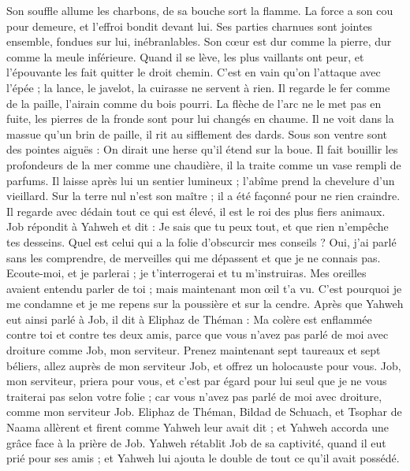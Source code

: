 \begin{multicols}{2}
Son souffle allume les charbons, de sa bouche sort la flamme.
La force a son cou pour demeure, et l'effroi bondit devant lui.
Ses parties charnues sont jointes ensemble, fondues sur lui, inébranlables.
Son cœur est dur comme la pierre, dur comme la meule inférieure.
Quand il se lève, les plus vaillants ont peur, et l'épouvante les fait quitter le droit chemin.
C'est en vain qu'on l'attaque avec l'épée ; la lance, le javelot, la cuirasse ne servent à rien.
Il regarde le fer comme de la paille, l'airain comme du bois pourri.
La flèche de l'arc ne le met pas en fuite, les pierres de la fronde sont pour lui changés en chaume.
Il ne voit dans la massue qu'un brin de paille, il rit au sifflement des dards.
Sous son ventre sont des pointes aiguës : On dirait une herse qu'il étend sur la boue.
Il fait bouillir les profondeurs de la mer comme une chaudière, il la traite comme un vase rempli de parfums.
Il laisse après lui un sentier lumineux ; l'abîme prend la chevelure d'un vieillard.
Sur la terre nul n'est son maître ; il a été façonné pour ne rien craindre.
Il regarde avec dédain tout ce qui est élevé, il est le roi des plus fiers animaux.
\VerseOne{}Job répondit à Yahweh et dit :
Je sais que tu peux tout, et que rien n'empêche tes desseins.
Quel est celui qui a la folie d'obscurcir mes conseils ? Oui, j'ai parlé sans les comprendre, de merveilles qui me dépassent et que je ne connais pas.
Ecoute-moi, et je parlerai ; je t'interrogerai et tu m'instruiras.
Mes oreilles avaient entendu parler de toi ; mais maintenant mon œil t'a vu.
C'est pourquoi je me condamne et je me repens sur la poussière et sur la cendre.
Après que Yahweh eut ainsi parlé à Job, il dit à Eliphaz de Théman : Ma colère est enflammée contre toi et contre tes deux amis, parce que vous n'avez pas parlé de moi avec droiture comme Job, mon serviteur.
Prenez maintenant sept taureaux et sept béliers, allez auprès de mon serviteur Job, et offrez un holocauste pour vous. Job, mon serviteur, priera pour vous, et c'est par égard pour lui seul que je ne vous traiterai pas selon votre folie ; car vous n'avez pas parlé de moi avec droiture, comme mon serviteur Job.
Eliphaz de Théman, Bildad de Schuach, et Tsophar de Naama allèrent et firent comme Yahweh leur avait dit ; et Yahweh accorda une grâce face à la prière de Job.
Yahweh rétablit Job de sa captivité, quand il eut prié pour ses amis ; et Yahweh lui ajouta le double de tout ce qu'il avait possédé.

\end{multicols}
